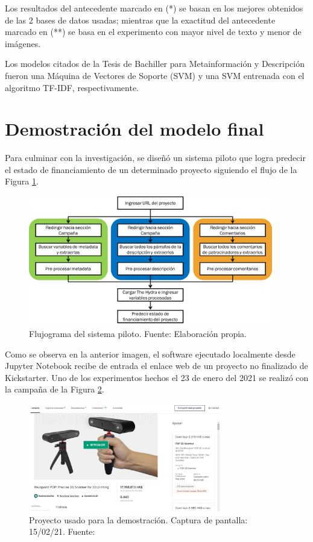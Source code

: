 Los resultados del antecedente marcado en (*) se basan en los mejores obtenidos de las 2 bases de datos usadas; mientras que la exactitud del antecedente marcado en (**) se basa en el experimento con mayor nivel de texto y menor de imágenes.

Los modelos citados de la Tesis de Bachiller para Metainformación y Descripción fueron una Máquina de Vectores de Soporte (SVM) y una SVM entrenada con el algoritmo TF-IDF, respectivamente.

\section{Demostración del modelo final}
Para culminar con la investigación, se diseñó un sistema piloto que logra predecir el estado de financiamiento de un determinado proyecto siguiendo el flujo de la Figura \ref{5:fig13}.

\begin{figure}[h]
	\begin{center}
		\includegraphics[width=0.95\textwidth]{5/figures/demo_flux.png}
		\caption{Flujograma del sistema piloto. Fuente: Elaboración propia.}
		\label{5:fig13}
	\end{center}
\end{figure}

Como se observa en la anterior imagen, el software ejecutado localmente desde Jupyter Notebook recibe de entrada el enlace web de un proyecto no finalizado de Kickstarter. Uno de los experimentos hechos el 23 de enero del 2021 se realizó con la campaña de la Figura \ref{5:fig14}.

\begin{figure}[!ht]
	\begin{center}
		\includegraphics[width=0.75\textwidth]{5/figures/example_project_150221.jpg}
		\caption{Proyecto usado para la demostración. Captura de pantalla: 15/02/21. Fuente: \cite{ot_kickstarter_revopointproject}}
		\label{5:fig14}
	\end{center}
\end{figure}

